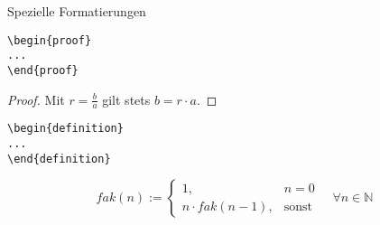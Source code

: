 \begin{frame}[fragile]{Spezielle Formatierungen}
\begin{minipage}{0.3\linewidth}
\begin{lstlisting}[style=tex]
\begin{proof}
...
\end{proof}
\end{lstlisting}
\end{minipage}
\hfill
\begin{minipage}{0.65\linewidth}
\begin{proof}
Mit $r=\frac{b}{a}$ gilt stets $b=r\cdot a$.
\end{proof}
\end{minipage}

\begin{minipage}{0.3\linewidth}
\begin{lstlisting}[style=tex]
\begin{definition}
...
\end{definition}
\end{lstlisting}
\end{minipage}
\hfill
\begin{minipage}{0.65\linewidth}
\begin{definition}
\[ fak(n) := \begin{cases}
1, & n = 0 \\
n\cdot fak(n-1), & \text{sonst}
\end{cases}
\quad
\forall n \in \mathbb{N} \]
\end{definition}
\end{minipage}
\end{frame}